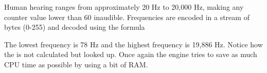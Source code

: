 \documentclass[book.tex]{subfiles}
\begin{document}
\par
Human hearing ranges from approximately 20 Hz to 20,000 Hz, making any counter value lower than 60 inaudible. Frequencies are encoded in a stream of bytes (0-255) and decoded using the formula\\

\par
\begin{minipage}{\textwidth}

\end{minipage}

\par
The lowest frequency is 78 Hz and the highest frequency is 19,886 Hz. Notice how the  is not calculated but looked up. Once again the engine tries to save as much CPU time as possible by using a bit of RAM.\\

\par
\begin{minipage}{\textwidth}

\end{minipage}
\par
\end{document}
